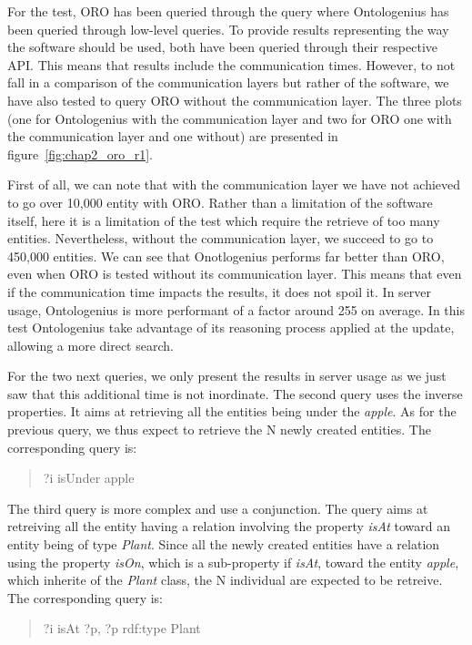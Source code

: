 For the test, ORO has been queried through the \sparql{} query where Ontologenius has been queried through low-level queries. To provide results representing the way the software should be used, both have been queried through their respective API. This means that results include the communication times. However, to not fall in a comparison of the communication layers but rather of the software, we have also tested to query ORO without the communication layer. The three plots (one for Ontologenius with the communication layer and two for ORO one with the communication layer and one without) are presented in figure~\ref{fig:chap2_oro_r1}.

First of all, we can note that with the communication layer we have not achieved to go over 10,000 entity with ORO. Rather than a limitation of the software itself, here it is a limitation of the test which require the retrieve of too many entities. Nevertheless, without the communication layer, we succeed to go to 450,000 entities. We can see that Onotlogenius performs far better than ORO, even when ORO is tested without its communication layer. This means that even if the communication time impacts the results, it does not spoil it. In server usage, Ontologenius is more performant of a factor around 255 on average. In this test Ontologenius take advantage of its reasoning process applied at the update, allowing a more direct search.

For the two next queries, we only present the results in server usage as we just saw that this additional time is not inordinate. The second query uses the inverse properties. It aims at retrieving all the entities being under the \textit{apple}. As for the previous query, we thus expect to retrieve the N newly created entities. The corresponding \sparql query is:

\begin{quote} 
\centering 
?i isUnder apple
\end{quote}

The third query is more complex and use a conjunction. The query aims at retreiving all the entity having a relation involving the property \textit{isAt} toward an entity being of type \textit{Plant}. Since all the newly created entities have a relation using the property \textit{isOn}, which is a sub-property if \textit{isAt}, toward the entity \textit{apple}, which inherite of the \textit{Plant} class, the N individual are expected to be retreive. The corresponding \sparql{} query is:

\begin{quote} 
\centering 
?i isAt ?p, ?p rdf:type Plant
\end{quote}


